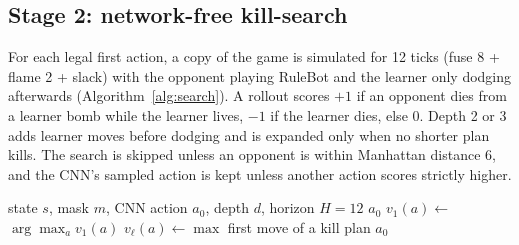 \documentclass[journal]{IEEEtran}
\begin{document}
\subsection{Stage 2: network-free kill-search}
For each legal first action, a copy of the game is simulated for 12 ticks (fuse 8 + flame 2 + slack) with the opponent playing RuleBot and the learner only dodging afterwards (Algorithm~\ref{alg:search}). A rollout scores $+1$ if an opponent dies from a learner bomb while the learner lives, $-1$ if the learner dies, else 0. Depth 2 or 3 adds learner moves before dodging and is expanded only when no shorter plan kills. The search is skipped unless an opponent is within Manhattan distance 6, and the CNN's sampled action is kept unless another action scores strictly higher.

\begin{algorithm}[t]
\caption{Kill-search of depth $d$ (play time)}
\label{alg:search}
\small
\begin{algorithmic}[1]
\Require state $s$, mask $m$, CNN action $a_0$, depth $d$, horizon $H=12$
 \Return $a_0$ \EndIf
{}
  \State $v_1(a)\gets$  
\EndFor
{} \Return $\arg\max_a v_1(a)$ \EndIf
{} 
    \State $v_\ell(a)\gets\max$ 
  \EndFor
   \Return first move of a kill plan \EndIf
\EndFor
\State \Return $a_0$
\end{algorithmic}
\end{algorithm}
\end{document}
